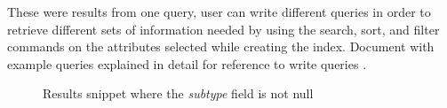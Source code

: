 These were results from one query, user can write different queries in order to retrieve different sets of information needed by using the search, sort, and filter commands on the attributes selected while creating the index. Document with example queries explained in detail for reference to write queries \cite{azqueries}.
\begin {figure}[h!h]
    \centering
    \caption{Results snippet where the \textit{subtype} field is not null}
    \label{piisubtype}
\end {figure}
